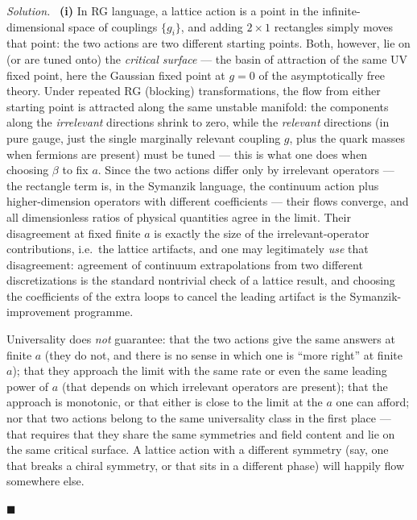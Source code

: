 \documentclass[11pt]{article}
\newenvironment{solution}{\par\smallskip\noindent\textit{Solution.}\ }{\hfill$\blacksquare$\par\smallskip}
\begin{document}
\begin{solution}
\textbf{(i)} In RG language, a lattice action is a point in the infinite-dimensional space of couplings $\{g_i\}$, and adding $2\times1$ rectangles simply moves that point: the two actions are two different starting points. Both, however, lie on (or are tuned onto) the \emph{critical surface} --- the basin of attraction of the same UV fixed point, here the Gaussian fixed point at $g=0$ of the asymptotically free theory. Under repeated RG (blocking) transformations, the flow from either starting point is attracted along the same unstable manifold: the components along the \emph{irrelevant} directions shrink to zero, while the \emph{relevant} directions (in pure gauge, just the single marginally relevant coupling $g$, plus the quark masses when fermions are present) must be tuned --- this is what one does when choosing $\beta$ to fix $a$. Since the two actions differ only by irrelevant operators --- the rectangle term is, in the Symanzik language, the continuum action plus higher-dimension operators with different coefficients --- their flows converge, and all dimensionless ratios of physical quantities agree in the limit. Their disagreement at fixed finite $a$ is exactly the size of the irrelevant-operator contributions, i.e.\ the lattice artifacts, and one may legitimately \emph{use} that disagreement: agreement of continuum extrapolations from two different discretizations is the standard nontrivial check of a lattice result, and choosing the coefficients of the extra loops to cancel the leading artifact is the Symanzik-improvement programme.

Universality does \emph{not} guarantee: that the two actions give the same answers at finite $a$ (they do not, and there is no sense in which one is ``more right'' at finite $a$); that they approach the limit with the same rate or even the same leading power of $a$ (that depends on which irrelevant operators are present); that the approach is monotonic, or that either is close to the limit at the $a$ one can afford; nor that two actions belong to the same universality class in the first place --- that requires that they share the same symmetries and field content and lie on the same critical surface. A lattice action with a different symmetry (say, one that breaks a chiral symmetry, or that sits in a different phase) will happily flow somewhere else.


\end{solution}
\end{document}
